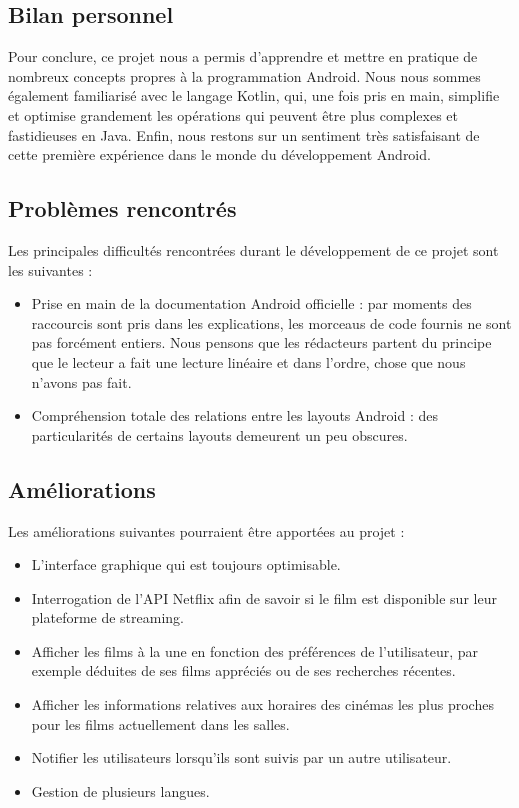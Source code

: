 \subsection{Bilan personnel}
Pour conclure, ce projet nous a permis d'apprendre et mettre en pratique de nombreux concepts propres à la programmation Android. Nous nous sommes également familiarisé avec le langage Kotlin, qui, une fois pris en main, simplifie et optimise grandement les opérations qui peuvent être plus complexes et fastidieuses en Java. Enfin, nous restons sur un sentiment très satisfaisant de cette première expérience dans le monde du développement Android.

\subsection{Problèmes rencontrés}
Les principales difficultés rencontrées durant le développement de ce projet sont les suivantes :
\begin{itemize}
    \item Prise en main de la documentation Android officielle : par moments des raccourcis sont pris dans les explications, les morceaus de code fournis ne sont pas forcément entiers. Nous pensons que les rédacteurs partent du principe que le lecteur a fait une lecture linéaire et dans l'ordre, chose que nous n'avons pas fait.
    \item Compréhension totale des relations entre les layouts Android : des particularités de certains layouts demeurent un peu obscures.
\end{itemize}

\subsection{Améliorations}
Les améliorations suivantes pourraient être apportées au projet :
\begin{itemize}
    \item L'interface graphique qui est toujours optimisable.
    \item Interrogation de l'API Netflix afin de savoir si le film est disponible sur leur plateforme de streaming.
    \item Afficher les films à la une en fonction des préférences de l'utilisateur, par exemple déduites de ses films appréciés ou de ses recherches récentes.
    \item Afficher les informations relatives aux horaires des cinémas les plus proches pour les films actuellement dans les salles.
    \item Notifier les utilisateurs lorsqu'ils sont suivis par un autre utilisateur.
    \item Gestion de plusieurs langues.
\end{itemize}
